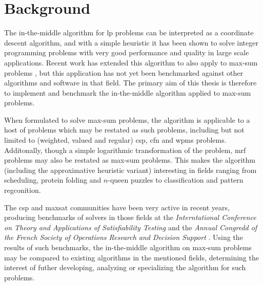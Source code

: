 \section{Background}
The in-the-middle algorithm \parencite{Wedelin95} for \acrlong{lp} problems can be interpreted as a coordinate descent algorithm, and with a simple heuristic it has been shown to solve integer programming problems with very good performance and quality in large scale applications.
Recent work has extended this algorithm to also apply to max-sum problems \parencites{Wedelin08}{Wedelin13}, but this application has not yet been benchmarked against other algorithms and software in that field.
The primary aim of this thesis is therefore to implement and benchmark the in-the-middle algorithm applied to max-sum problems.

When formulated to solve max-sum problems, the algorithm is applicable to a host of problems which may be restated as such problems, including but not limited to (weighted, valued and regular) \gls{csp}, \gls{cfn} and \gls{wpms} problems.
Additonally, though a simple logarithmic transformation of the problem, \gls{mrf} problems may also be restated as max-sum problems.
This makes the algorithm (including the approximative heuristic variant) interesting in fields ranging from scheduling, protein folding and \(n\)-queen puzzles to classification and pattern regconition.

The \gls{csp} and \gls{maxsat} communities have been very active in recent years, producing benchmarks of solvers in those fields at the \emph{Interntational Conference on Theory and Applications of Satisfiability Testing} \parencite{Argelich11} and the \emph{Annual Congredd of the French Society of Operations Research and Decision Support} \parencite{Allouche14b}.
Using the results of such benchmarks, the in-the-middle algorithm on max-sum problems may be compared to existing algorithms in the mentioned fields, determining the interest of futher developing, analyzing or specializing the algorithm for such problems.
